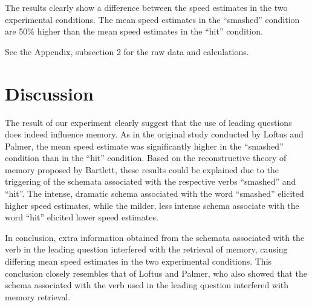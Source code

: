 \documentclass[a4paper,11pt]{report}
\begin{document}
The results clearly show a difference between the speed estimates in the
two experimental conditions. The mean speed estimates in the “smashed”
condition are 50\% higher than the mean speed estimates in the “hit”
condition.

See the Appendix, subsection 2 for the raw data and calculations.

\section{Discussion}

The result of our experiment clearly suggest that the use of leading
questions does indeed influence memory. As in the original study conducted
by Loftus and Palmer, the mean speed estimate was significantly higher in
the “smashed” condition than in the “hit” condition. Based on the
reconstructive theory of memory proposed by Bartlett, these results could
be explained due to the triggering of the schemata associated with the
respective verbs “smashed” and “hit”. The intense, dramatic schema
associated with the word “smashed” elicited higher speed estimates, while
the milder, less intense schema associate with the word “hit” elicited
lower speed estimates.

In conclusion, extra information obtained from the schemata associated with
the verb in the leading question interfered with the retrieval of memory,
causing differing mean speed estimates in the two experimental conditions.
This conclusion closely resembles that of Loftus and Palmer, who also
showed that the schema associated with the verb used in the leading question
interfered with memory retrieval.
\end{document}
